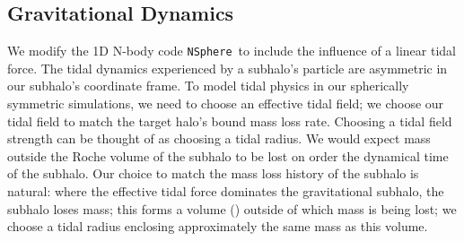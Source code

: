 \documentclass[%
 reprint,
 amsmath,
 amssymb,
 aps,
]{revtex4-2}
\def\nsphere{{\tt NSphere}~}
\begin{document}
 \subsection{Gravitational Dynamics}\label{sec-dynamics}
  We modify the 1D N-body code \nsphere to include the influence of a linear tidal force. The tidal dynamics experienced by a subhalo's particle are asymmetric in our subhalo's coordinate frame. 
To model tidal physics in our spherically symmetric simulations, we need to choose an effective tidal field; we choose our tidal field to match the target halo's bound mass loss rate. 
Choosing a tidal field strength can be thought of as choosing a tidal radius.
We would expect mass outside the Roche volume of the subhalo to be lost on order the dynamical time of the subhalo. 
Our choice to match the mass loss history of the subhalo is natural: where the effective tidal force dominates the gravitational subhalo, the subhalo loses mass; this forms a volume () outside of which mass is being lost; we choose a tidal radius enclosing approximately the same mass as this volume. 
\end{document}
